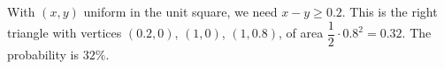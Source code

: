 With $(x,y)$ uniform in the unit square, we need $x-y\ge0.2$. This is the right triangle with vertices $(0.2,0)$, $(1,0)$, $(1,0.8)$, of area $\dfrac12\cdot0.8^2=0.32$. The probability is $\boxed{32\%}$.
